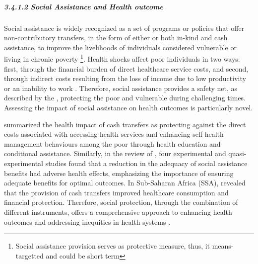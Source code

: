  
\paragraph{\quad \quad \textit{3.4.1.2	Social Assistance and Health outcome}}
\subparagraph{}
Social assistance is widely recognized as a set of programs or policies that offer non-contributory transfers, in the form of either or both in-kind and cash assistance, to improve the livelihoods of individuals considered vulnerable or living in chronic poverty \parencite{heggebo_disentangling_2020, shahidi_impact_2019, world_bank_state_2015} \footnote{Social assistance provision serves as protective measure, thus, it means-targetted and could be short term}. Health shocks affect poor individuals in two ways: first, through the financial burden of direct healthcare service costs, and second, through indirect costs resulting from the loss of income due to low productivity or an inability to work \parencite{helmsmuller_does_2022}. Therefore, social assistance provides a safety net, as described by the \textcite{world_bank_state_2015}, protecting the poor and vulnerable during challenging times. Assessing the impact of social assistance on health outcomes is particularly novel.

\textcite{adato_social_2009} summarized the health impact of cash transfers as protecting against the direct costs associated with accessing health services and enhancing self-health management behaviours among the poor through health education and conditional assistance. Similarly, in the review of \textcite{shahidi_impact_2019}, four experimental and quasi-experimental studies found that a reduction in the adequacy of social assistance benefits had adverse health effects, emphasizing the importance of ensuring adequate benefits for optimal outcomes. In Sub-Saharan Africa (SSA), \textcite{owusu-addo_impact_2018} revealed that the provision of cash transfers improved healthcare consumption and financial protection. 
Therefore, social protection, through the combination of different instruments, offers a comprehensive approach to enhancing health outcomes and addressing inequities in health systems \parencite{hagemejer_role_2013, world_bank_high-performance_2019, yokobori_roles_2023, ilo_towards_2020, who_world_2010}. 

